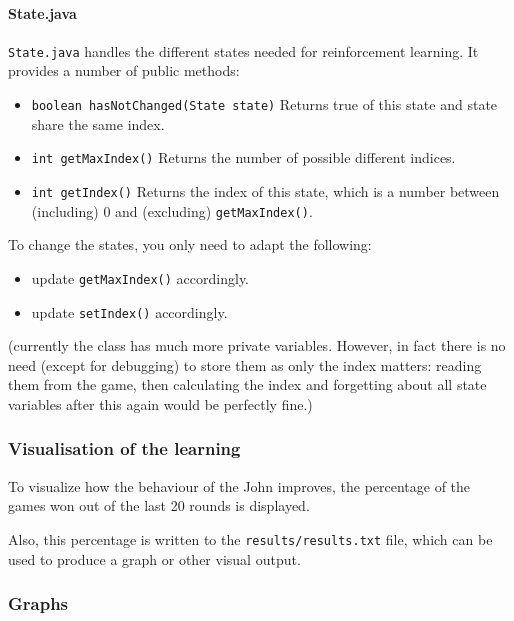 \documentclass[a4paper,10pt]{scrartcl}
\begin{document}
\paragraph{State.java}
\verb|State.java| handles the different states needed for reinforcement learning. It provides a number of public methods:
\begin{itemize}
 \item \verb|boolean hasNotChanged(State state)| Returns true of this state and state share the same index.
 \item \verb|int getMaxIndex()| Returns the number of possible different indices.
 \item \verb|int getIndex()| Returns the index of this state, which is a number between (including) 0 and (excluding) \verb|getMaxIndex()|.
\end{itemize} 

To change the states, you only need to adapt the following:
\begin{itemize}
 \item update \verb|getMaxIndex()| accordingly.
 \item update \verb|setIndex()| accordingly.
\end{itemize}

(currently the class has much more private variables. However, in fact there is no need (except for debugging) to store them as only the index matters: reading them from the game, then calculating the index and forgetting about all state variables after this again would be perfectly fine.)

\subsubsection{Visualisation of the learning}
To visualize how the behaviour of the John improves, the percentage of the games won out of the last 20 rounds is displayed.

Also, this percentage is written to the \verb|results/results.txt| file, which can be used to produce a graph or other visual output.

\subsubsection{Graphs}

\begin{figure}[htp]
\centering
\caption{}\label{fig:randomness_90_ogres_2}
\end{figure}
\end{document}
